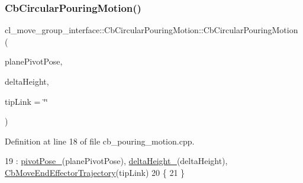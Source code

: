 \subsubsection{\texorpdfstring{Cb\+Circular\+Pouring\+Motion()}{CbCircularPouringMotion()}\hspace{0.1cm}{\footnotesize\ttfamily [2/3]}}
{\footnotesize\ttfamily cl\+\_\+move\+\_\+group\+\_\+interface\+::\+Cb\+Circular\+Pouring\+Motion\+::\+Cb\+Circular\+Pouring\+Motion (\begin{DoxyParamCaption}\item[{const geometry\+\_\+msgs\+::\+Pose\+Stamped \&}]{plane\+Pivot\+Pose,  }\item[{double}]{delta\+Height,  }\item[{std\+::string}]{tip\+Link = {\ttfamily \char`\"{}\char`\"{}} }\end{DoxyParamCaption})}



Definition at line 18 of file cb\+\_\+pouring\+\_\+motion.\+cpp.


\begin{DoxyCode}
19         : \hyperlink{classcl__move__group__interface_1_1CbCircularPouringMotion_a58ce9c29e4ef8f09a7569d6d8f9df56b}{pivotPose\_}(planePivotPose), \hyperlink{classcl__move__group__interface_1_1CbCircularPouringMotion_a7009d617bcd8ac1fba49100444434f3c}{deltaHeight\_}(deltaHeight), 
      \hyperlink{classcl__move__group__interface_1_1CbMoveEndEffectorTrajectory_af7e718b0c53e912fd74968abbb0a4810}{CbMoveEndEffectorTrajectory}(tipLink)
20     \{
21     \}
\end{DoxyCode}
\mbox{\label{classcl__move__group__interface_1_1CbCircularPouringMotion_a6ee291bffe6f492730db93e20be240d1}} 
